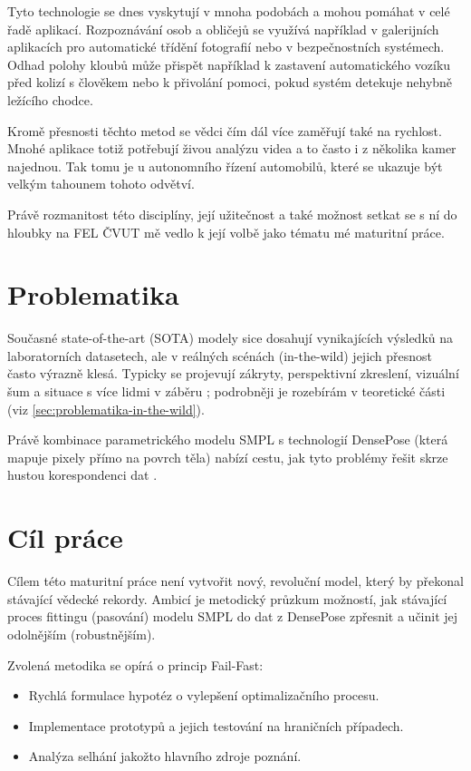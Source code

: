\documentclass[11pt,a4paper,twoside,openright]{report}
\begin{document}
Tyto technologie se dnes vyskytují v mnoha podobách a mohou pomáhat v celé řadě aplikací. Rozpoznávání osob a obličejů se využívá například v galerijních aplikacích pro automatické třídění fotografií nebo v bezpečnostních systémech. Odhad polohy kloubů může přispět například k zastavení automatického vozíku před kolizí s člověkem nebo k přivolání pomoci, pokud systém detekuje nehybně ležícího chodce.

Kromě přesnosti těchto metod se vědci čím dál více zaměřují také na rychlost. Mnohé aplikace totiž potřebují živou analýzu videa a to často i z několika kamer najednou. Tak tomu je u autonomního řízení automobilů, které se ukazuje být velkým tahounem tohoto odvětví.

Právě rozmanitost této disciplíny, její užitečnost a také možnost setkat se s ní do hloubky na FEL ČVUT mě vedlo k její volbě jako tématu mé maturitní práce.

\section{Problematika}

Současné state-of-the-art (SOTA) modely sice dosahují vynikajících výsledků na laboratorních datasetech, ale v reálných scénách (in-the-wild) jejich přesnost často výrazně klesá. Typicky se projevují zákryty, perspektivní zkreslení, vizuální šum a situace s více lidmi v záběru \cite{guler2018densepose,wang2024prompthmr}; podrobněji je rozebírám v teoretické části (viz \ref{sec:problematika-in-the-wild}).

Právě kombinace parametrického modelu SMPL s technologií DensePose (která mapuje pixely přímo na povrch těla) nabízí cestu, jak tyto problémy řešit skrze hustou korespondenci dat \cite{SMPL:2015,guler2018densepose,le2024meshpose}.

\section{Cíl práce}

Cílem této maturitní práce není vytvořit nový, revoluční model, který by překonal stávající vědecké rekordy. Ambicí je metodický průzkum možností, jak stávající proces fittingu (pasování) modelu SMPL do dat z DensePose zpřesnit a učinit jej odolnějším (robustnějším).

Zvolená metodika se opírá o princip Fail-Fast:

\begin{itemize}
    \item Rychlá formulace hypotéz o vylepšení optimalizačního procesu.
    \item Implementace prototypů a jejich testování na hraničních případech.
    \item Analýza selhání jakožto hlavního zdroje poznání.
\end{itemize}
\end{document}
